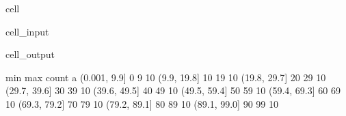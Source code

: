 \documentclass[letterpaper,10pt,english]{jupyterBook}
\begin{document}
\begin{sphinxuseclass}{cell}\begin{sphinxVerbatimInput}

\begin{sphinxuseclass}{cell_input}
\begin{sphinxVerbatim}[commandchars=\\\{\}]
  \PYG{p}{[}\PYG{p}{]} 
\PYG{p}{[}\PYG{p}{]}\PYG{p}{[}\PYG{p}{]}
\end{sphinxVerbatim}

\end{sphinxuseclass}\end{sphinxVerbatimInput}
\begin{sphinxVerbatimOutput}

\begin{sphinxuseclass}{cell_output}
\begin{sphinxVerbatim}[commandchars=\\\{\}]
               min  max  count
a                             
(\PYGZhy{}0.001, 9.9]    0    9     10
(9.9, 19.8]     10   19     10
(19.8, 29.7]    20   29     10
(29.7, 39.6]    30   39     10
(39.6, 49.5]    40   49     10
(49.5, 59.4]    50   59     10
(59.4, 69.3]    60   69     10
(69.3, 79.2]    70   79     10
(79.2, 89.1]    80   89     10
(89.1, 99.0]    90   99     10
\end{sphinxVerbatim}

\end{sphinxuseclass}\end{sphinxVerbatimOutput}

\end{sphinxuseclass}
\end{document}
